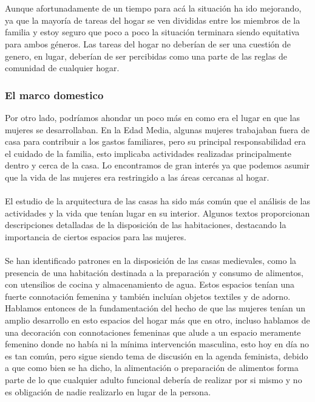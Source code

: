 \documentclass{report}
\begin{document}
\\\\
Aunque afortunadamente de un tiempo para acá la situación ha ido mejorando, ya que la mayoría de tareas del hogar se ven divididas entre los miembros de la familia y estoy seguro que poco a poco la situación terminara siendo equitativa para ambos géneros. Las tareas del hogar no deberían de ser una cuestión de genero, en lugar, deberían de ser percibidas como una parte de las reglas de comunidad de cualquier hogar. 
\subsubsection{El marco domestico}
Por otro lado, podríamos ahondar un poco más en como era el lugar en que las mujeres se desarrollaban. En la Edad Media, algunas mujeres trabajaban fuera de casa para contribuir a los gastos familiares, pero su principal responsabilidad era el cuidado de la familia, esto implicaba actividades realizadas principalmente dentro y cerca de la casa. Lo encontramos de gran interés ya que podemos asumir que la vida de las mujeres era restringido a las áreas cercanas al hogar. 
\\\\
El estudio de la arquitectura de las casas ha sido más común que el análisis de las actividades y la vida que tenían lugar en su interior. Algunos textos proporcionan descripciones detalladas de la disposición de las habitaciones, destacando la importancia de ciertos espacios para las mujeres.
\\\\
Se han identificado patrones en la disposición de las casas medievales, como la presencia de una habitación destinada a la preparación y consumo de alimentos, con utensilios de cocina y almacenamiento de agua. Estos espacios tenían una fuerte connotación femenina y también incluían objetos textiles y de adorno. Hablamos entonces de la fundamentación del hecho de que las mujeres tenían un amplio desarrollo en esto espacios del hogar más que en otro, incluso hablamos de una decoración con connotaciones femeninas que alude a un espacio meramente femenino donde no había ni la mínima intervención masculina, esto hoy en día no es tan común, pero sigue siendo tema de discusión en la agenda feminista, debido a que como bien se ha dicho, la alimentación o preparación de alimentos forma parte de lo que cualquier adulto funcional debería de realizar por si mismo y no es obligación de nadie realizarlo en lugar de la persona. 
\\\\
\end{document}
